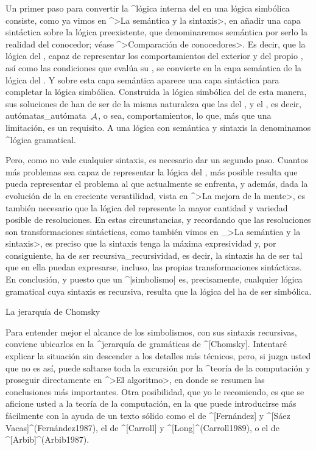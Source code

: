 Un primer paso para convertir la ^{lógica interna} del {\conocedor} en
una lógica simbólica consiste, como ya vimos en ^>La semántica y la
sintaxis>, en añadir una capa sintáctica sobre la lógica preexistente,
que denominaremos semántica por serlo la realidad del conocedor; véase
^>Comparación de conocedores>. Es decir, que la lógica del {\conocedor},
capaz de representar los comportamientos del {\universo} exterior y del
propio {\conocedor}, así como las condiciones que evalúa su
{\inteligencia}, se convierte en la capa semántica de la lógica del
{\sujeto}. Y sobre esta capa semántica aparece una capa sintáctica para
completar la lógica simbólica. Construida la lógica simbólica del
{\sujeto} de esta manera, sus soluciones de han de ser de la misma
naturaleza que las del {\conocedor}, y el {\aprendiz}, es decir,
autómatas_{autómata}~$\aut A$, o sea, comportamientos, lo que, más que
una limitación, es un requisito. A una lógica con semántica y sintaxis
la denominamos ^{lógica gramatical}.

Pero, como no vale cualquier sintaxis, es necesario dar un segundo paso.
Cuantos más problemas sea capaz de representar la lógica del {\sujeto},
más posible resulta que pueda representar el problema al que actualmente
se enfrenta, y además, dada la evolución de la {\mente} en creciente
versatilidad, vista en ^>La mejora de la mente>, es también necesario
que la lógica del {\sujeto} represente la mayor cantidad y variedad
posible de resoluciones. En estas circunstancias, y recordando que las
resoluciones son transformaciones sintácticas, como también vimos en
_>La semántica y la sintaxis>, es preciso que la sintaxis tenga la
máxima expresividad y, por consiguiente, ha de ser
recursiva_{recursividad}, es decir, la sintaxis ha de ser tal que en
ella puedan expresarse, incluso, las propias transformaciones
sintácticas. En conclusión, y puesto que un ^|simbolismo| es,
precisamente, cualquier lógica gramatical cuya sintaxis es recursiva,
resulta que la lógica del {\sujeto} ha de ser simbólica.


\Section La jerarquía de Chomsky

Para entender mejor el alcance de los simbolismos, con sus sintaxis
recursivas, conviene ubicarlos en la ^{jerarquía de gramáticas} de
^[Chomsky]. Intentaré explicar la situación sin descender a los detalles
más técnicos, pero, si juzga usted que no es así, puede saltarse toda la
excursión por la ^{teoría de la computación} y proseguir directamente en
^>El algoritmo>, en donde se resumen las conclusiones más importantes.
Otra posibilidad, que yo le recomiendo, es que se aficione usted a la
teoría de la computación, en la que puede introducirse más fácilmente
con la ayuda de un texto sólido como el de ^[Fernández] y ^[Sáez
Vacas]^(Fernández1987), el de ^[Carroll] y ^[Long]^(Carroll1989), o el
de ^[Arbib]^(Arbib1987).


